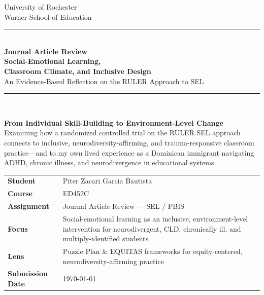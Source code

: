 \documentclass[11pt]{article}
\begin{document}
\begin{titlepage}
\thispagestyle{empty}

\begin{center}
{\large University of Rochester\\}
{\normalsize Warner School of Education\\[0.15in]}

{\color{PrimaryRed}\rule{\textwidth}{1.4pt}}\\[0.12in]
{\huge\bfseries Journal Article Review\\[0.08in]
\Huge Social-Emotional Learning,\\[0.08in]
Classroom Climate, and Inclusive Design}\\[0.18in]
{\Large An Evidence-Based Reflection on the RULER Approach to SEL}\\[0.12in]
{\color{PrimaryRed}\rule{0.78\textwidth}{0.7pt}}\\[0.22in]

\colorbox{SoftBlue}{%
\parbox{0.88\textwidth}{%
\centering\small\vspace{0.02in}
\textbf{From Individual Skill-Building to Environment-Level Change}\\[0.05in]
Examining how a randomized controlled trial on the RULER SEL approach connects to inclusive, neurodiversity-affirming, and trauma-responsive classroom practice---and to my own lived experience as a Dominican immigrant navigating ADHD, chronic illness, and neurodivergence in educational systems.
}%
}
\end{center}

\vspace{0.12in}

\begin{center}
\renewcommand{\arraystretch}{1.18}
\setlength{\tabcolsep}{4pt}
\begin{tabular}{>{\bfseries\RaggedLeft}p{1.65in} p{4.9in}}
Student         & Piter Zacari Garcia Bautista \\
Course          & ED452C \\
Assignment      & Journal Article Review --- SEL / PBIS \\
Focus           & Social-emotional learning as an inclusive, environment-level intervention for neurodivergent, CLD, chronically ill, and multiply-identified students \\
Lens            & Puzzle Plan \& EQUITAS frameworks for equity-centered, neurodiversity-affirming practice \\
Submission Date & \today \\
\end{tabular}
\end{center}


\end{titlepage}
\end{document}

